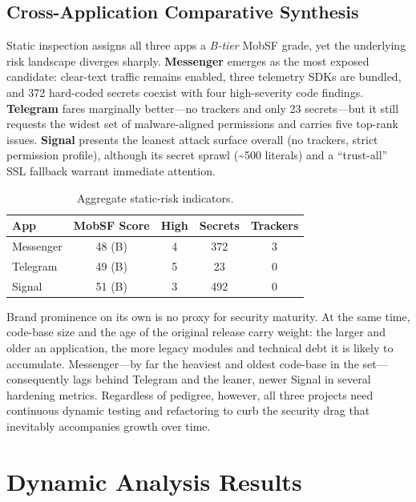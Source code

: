 \documentclass[a4paper,12pt]{report}
\begin{document}
\subsection{Cross-Application Comparative Synthesis}
\label{sec:comparative-synthesis}

Static inspection assigns all three apps a \emph{B-tier} MobSF grade, yet the
underlying risk landscape diverges sharply.  \textbf{Messenger} emerges as the
most exposed candidate: clear-text traffic remains enabled, three telemetry
SDKs are bundled, and {\small 372} hard-coded secrets coexist with four
high-severity code findings.  \textbf{Telegram} fares marginally better—no
trackers and only 23 secrets—but it still requests the widest set of
malware-aligned permissions and carries five top-rank issues.  \textbf{Signal}
presents the leanest attack surface overall (no trackers, strict permission
profile), although its secret sprawl (\textasciitilde500 literals) and a
``trust-all'' SSL fallback warrant immediate attention.

\begin{table}[htbp]
  \centering
  \caption{Aggregate static-risk indicators.}
  \label{tab:risk-matrix}
  \begin{tabular}{|l|c|c|c|c|}
    \hline
    \textbf{App} & \textbf{MobSF Score} & \textbf{High} & \textbf{Secrets} & \textbf{Trackers} \\ \hline
    Messenger   & 48 (B) & 4 & 372 & 3 \\ \hline
    Telegram    & 49 (B) & 5 &  23 & 0 \\ \hline
    Signal      & 51 (B) & 3 & 492 & 0 \\ \hline
  \end{tabular}
\end{table}

Brand prominence on its own is no proxy for security maturity. At the same
time, code-base size and the age of the original release carry
weight: the larger and older an application, the more legacy modules and
technical debt it is likely to accumulate. Messenger—by far the heaviest and
oldest code-base in the set—consequently lags behind Telegram and the leaner,
newer Signal in several hardening metrics. Regardless of pedigree, however,
all three projects need continuous dynamic testing and refactoring to curb the
security drag that inevitably accompanies growth over time.



\section{Dynamic Analysis Results}
\end{document}
